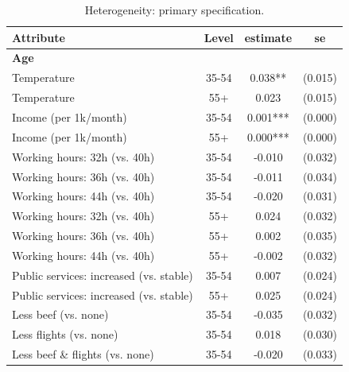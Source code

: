 \begin{table}[H]
    \centering
    \caption{Heterogeneity: primary specification.}
    \begin{tabular}{ l c c c }
\hline \hline
Attribute & Level & estimate & se \\
\hline
\multicolumn{4}{l}{\textbf{Age}} \\
\hspace{0.05cm} Temperature & 35-54 & 0.038** & (0.015) \\
\hspace{0.05cm} Temperature & 55+ & 0.023 & (0.015) \\
\hspace{0.05cm} Income (per 1k/month) & 35-54 & 0.001*** & (0.000) \\
\hspace{0.05cm} Income (per 1k/month) & 55+ & 0.000*** & (0.000) \\
\hspace{0.05cm} Working hours: 32h (vs. 40h) & 35-54 & -0.010 & (0.032) \\
\hspace{0.05cm} Working hours: 36h (vs. 40h) & 35-54 & -0.011 & (0.034) \\
\hspace{0.05cm} Working hours: 44h (vs. 40h) & 35-54 & -0.020 & (0.031) \\
\hspace{0.05cm} Working hours: 32h (vs. 40h) & 55+ & 0.024 & (0.032) \\
\hspace{0.05cm} Working hours: 36h (vs. 40h) & 55+ & 0.002 & (0.035) \\
\hspace{0.05cm} Working hours: 44h (vs. 40h) & 55+ & -0.002 & (0.032) \\
\hspace{0.05cm} Public services: increased (vs. stable) & 35-54 & 0.007 & (0.024) \\
\hspace{0.05cm} Public services: increased (vs. stable) & 55+ & 0.025 & (0.024) \\
\hspace{0.05cm} Less beef (vs. none) & 35-54 & -0.035 & (0.032) \\
\hspace{0.05cm} Less flights (vs. none) & 35-54 & 0.018 & (0.030) \\
\hspace{0.05cm} Less beef \& flights (vs. none) & 35-54 & -0.020 & (0.033) \\

\end{tabular}
\end{table}
